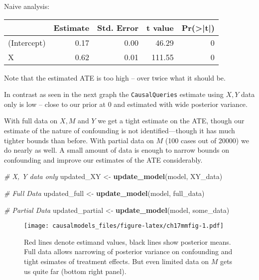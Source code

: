 \documentclass[
  12pt,
]{book}
\newenvironment{Shaded}{\begin{snugshade}}{\end{snugshade}}
\newcommand{\CommentTok}[1]{\textcolor[rgb]{0.56,0.35,0.01}{\textit{#1}}}
\newcommand{\DataTypeTok}[1]{\textcolor[rgb]{0.13,0.29,0.53}{#1}}
\newcommand{\DecValTok}[1]{\textcolor[rgb]{0.00,0.00,0.81}{#1}}
\newcommand{\KeywordTok}[1]{\textcolor[rgb]{0.13,0.29,0.53}{\textbf{#1}}}
\newcommand{\NormalTok}[1]{#1}
\newcommand{\OperatorTok}[1]{\textcolor[rgb]{0.81,0.36,0.00}{\textbf{#1}}}
\newcommand{\StringTok}[1]{\textcolor[rgb]{0.31,0.60,0.02}{#1}}
\begin{document}
Naive analysis:

\begin{Shaded}
\end{Shaded}

\begin{tabular}{l|r|r|r|r}
\hline
  & Estimate & Std. Error & t value & Pr(>|t|)\\
\hline
(Intercept) & 0.17 & 0.00 & 46.29 & 0\\
\hline
X & 0.62 & 0.01 & 111.55 & 0\\
\hline
\end{tabular}

Note that the estimated ATE is too high -- over twice what it should be.

In contrast as seen in the next graph the \texttt{CausalQueries} estimate using \(X,Y\) data only is low -- close to our prior at 0 and estimated with wide posterior variance.

With full data on \(X, M\) and \(Y\) we get a tight estimate on the ATE, though our estimate of the nature of confounding is not identified---though it has much tighter bounds than before. With partial data on \(M\) (100 cases out of 20000) we do nearly as well. A small amount of data is enough to narrow bounds on confounding and improve our estimates of the ATE considerably.

\begin{Shaded}
\begin{Highlighting}[]
\CommentTok{# X, Y data only}
\NormalTok{updated_XY      <-}\StringTok{ }\KeywordTok{update_model}\NormalTok{(model, XY_data)}

\CommentTok{# Full Data}
\NormalTok{updated_full    <-}\StringTok{ }\KeywordTok{update_model}\NormalTok{(model, full_data)}

\CommentTok{# Partial Data}
\NormalTok{updated_partial <-}\StringTok{ }\KeywordTok{update_model}\NormalTok{(model, some_data)}
\end{Highlighting}
\end{Shaded}

\begin{figure}
\centering
\texttt{[image: causalmodels\_files/figure-latex/ch17mmfig-1.pdf]}
\caption{\label{fig:ch17mmfig}Red lines denote estimand values, black lines show posterior means. Full data allows narrowing of posterior variance on confounding and tight esimates of treatment effects. But even limited data on \(M\) gets us quite far (bottom right panel).}
\end{figure}
\end{document}
